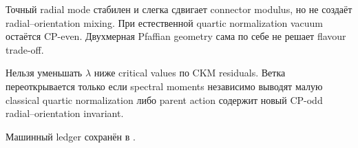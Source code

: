 \begin{theorem}
Точный radial mode стабилен и слегка сдвигает connector modulus, но не
создаёт radial--orientation mixing. При естественной quartic normalization
vacuum остаётся CP-even. Двухмерная Pfaffian geometry сама по себе не решает
flavour trade-off.
\end{theorem}

\begin{nogocriterion}
Нельзя уменьшать \(\lambda\) ниже critical values по CKM residuals. Ветка
переоткрывается только если spectral moments независимо выводят малую
classical quartic normalization либо parent action содержит новый CP-odd
radial--orientation invariant.
\end{nogocriterion}

Машинный ledger сохранён в
.